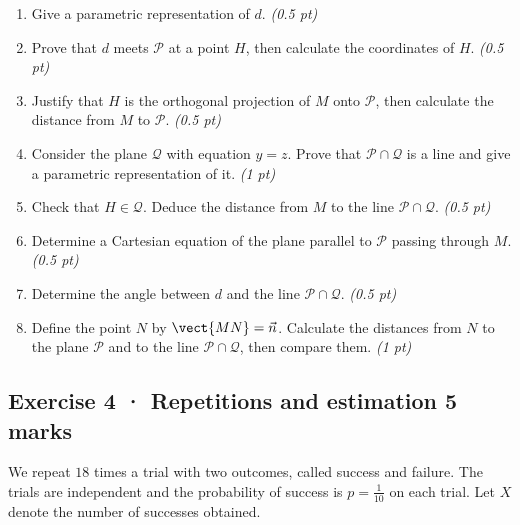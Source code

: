 \begin{enumerate}

\item Give a parametric representation of $d$. \hfill\textit{(0.5 pt)}

\item Prove that $d$ meets $\mathcal P$ at a point $H$, then calculate the coordinates of $H$. \hfill\textit{(0.5 pt)}

\item Justify that $H$ is the orthogonal projection of $M$ onto $\mathcal P$, then calculate the distance from $M$ to $\mathcal P$. \hfill\textit{(0.5 pt)}

\item Consider the plane $\mathcal Q$ with equation $y=z$. Prove that $\mathcal P\cap\mathcal Q$ is a line and give a parametric representation of it. \hfill\textit{(1 pt)}

\item Check that $H\in\mathcal Q$. Deduce the distance from $M$ to the line $\mathcal P\cap\mathcal Q$. \hfill\textit{(0.5 pt)}

\item Determine a Cartesian equation of the plane parallel to $\mathcal P$ passing through $M$. \hfill\textit{(0.5 pt)}

\item Determine the angle between $d$ and the line $\mathcal P\cap\mathcal Q$. \hfill\textit{(0.5 pt)}

\item Define the point $N$ by $\vect{MN}=\vec n$. Calculate the distances from $N$ to the plane $\mathcal P$ and to the line $\mathcal P\cap\mathcal Q$, then compare them. \hfill\textit{(1 pt)}

\end{enumerate}

\subsection*{Exercise 4 · Repetitions and estimation \hfill 5 marks}We repeat $18$ times a trial with two outcomes, called success and failure. The trials are independent and the probability of success is $p=\frac{1}{10}$ on each trial. Let $X$ denote the number of successes obtained.

